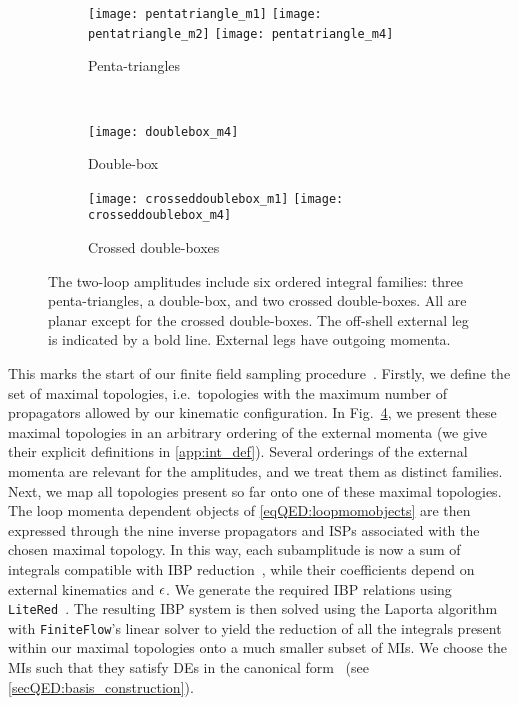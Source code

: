 \documentclass[main.tex]{subfiles}
\begin{document}
\begin{figure}
    \begin{center}
        \begin{subfigure}[c]{\linewidth}
            \centering
            \texttt{[image: pentatriangle\_m1]}
            \texttt{[image: pentatriangle\_m2]}
            \texttt{[image: pentatriangle\_m4]}
            \caption{Penta-triangles}
            \label{fig:pentatriangle}
        \end{subfigure}
        \\
        \vspace{1em}
        \begin{subfigure}[c]{0.3\linewidth}
            \centering
            \texttt{[image: doublebox\_m4]}
            \caption{Double-box}
            \label{fig:double-box}
        \end{subfigure}
        \begin{subfigure}[c]{0.6\linewidth}
            \centering
            \texttt{[image: crosseddoublebox\_m1]}
            \texttt{[image: crosseddoublebox\_m4]}
            \caption{Crossed double-boxes}
            \label{fig:crosseddouble-box}
        \end{subfigure}
    \end{center}
    \caption{ 
        The two-loop amplitudes include six ordered integral families: three penta-triangles, a double-box, and two crossed double-boxes.
        All are planar except for the crossed double-boxes.
        The off-shell external leg is indicated by a bold line.
        External legs have outgoing momenta.
    }
    \label{fig:int-fams}
\end{figure}
This marks the start of our finite field sampling
procedure~\cite{Peraro:2016wsq}. Firstly, we define the set of maximal topologies, i.e.~topologies with the maximum number of propagators allowed by our kinematic configuration. In Fig.~\ref{fig:int-fams}, we present these maximal topologies in an arbitrary ordering of the external momenta (we give their explicit definitions in \cref{app:int_def}). Several orderings of the external momenta are relevant for the amplitudes, and we treat them as distinct families. Next, we map all topologies present so far onto one of these maximal topologies. The loop momenta dependent objects of \cref{eqQED:loopmomobjects} are then expressed through the nine inverse propagators and ISPs associated with the chosen maximal topology. In this way, each subamplitude is now a sum of integrals compatible with IBP reduction~\cite{Tkachov:1981wb,Chetyrkin:1981qh}, while their coefficients depend on external kinematics and $\epsilon$. We generate the required IBP relations using \texttt{LiteRed}~\cite{Lee:2012cn}. The resulting IBP system is then solved using the Laporta algorithm~\cite{Laporta:2001dd} with \texttt{FiniteFlow}'s linear solver to yield the reduction of all the integrals present within our maximal topologies onto a much smaller subset of MIs. We choose the MIs such that they satisfy DEs in the canonical form~\cite{Henn:2013pwa} (see \cref{secQED:basis_construction}). 
\end{document}
